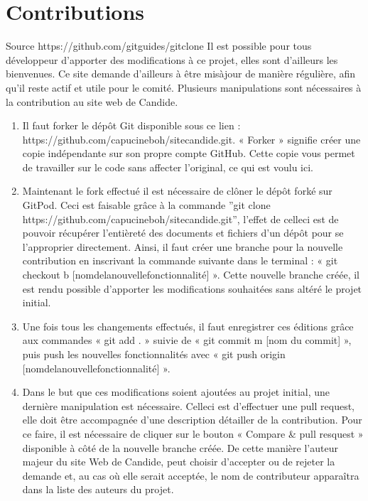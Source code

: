 \documentclass[a4,10pt,french]{sphinxmanual}
\begin{document}
\section{Contributions}
\label{\detokenize{chapitre-02:contributions}}
\sphinxAtStartPar
Source https://github.com/git\sphinxhyphen{}guides/git\sphinxhyphen{}clone
Il est possible pour tous développeur d’apporter des modifications à ce projet, elles sont d’ailleurs les bienvenues. Ce site demande d’ailleurs à être mis\sphinxhyphen{}à\sphinxhyphen{}jour de manière régulière, afin qu’il reste actif et utile pour le comité. Plusieurs manipulations sont nécessaires à la contribution au site web de Candide.
\begin{enumerate}
%
\item {} 
\sphinxAtStartPar
Il faut forker le dépôt Git disponible sous ce lien : https://github.com/capucineboh/site\sphinxhyphen{}candide.git. « Forker » signifie créer une copie indépendante sur son propre compte GitHub. Cette copie vous permet de travailler sur le code sans affecter l’original, ce qui est voulu ici.

\item {} 
\sphinxAtStartPar
Maintenant le fork effectué il est nécessaire de clôner le dépôt forké sur GitPod. Ceci est faisable grâce à la commande ”git clone https://github.com/capucineboh/site\sphinxhyphen{}candide.git”, l’effet de celle\sphinxhyphen{}ci est de pouvoir récupérer l’entièreté des documents et fichiers d’un dépôt pour se l’approprier directement. Ainsi, il faut créer une branche pour la nouvelle contribution en inscrivant la commande suivante dans le terminal : « git checkout \sphinxhyphen{}b {[}nom\sphinxhyphen{}de\sphinxhyphen{}la\sphinxhyphen{}nouvelle\sphinxhyphen{}fonctionnalité{]} ». Cette nouvelle branche créée, il est rendu possible d’apporter les modifications souhaitées sans altéré le projet initial.

\item {} 
\sphinxAtStartPar
Une fois tous les changements effectués, il faut enregistrer ces éditions grâce aux commandes « git add . » suivie de « git commit \sphinxhyphen{}m {[}nom du commit{]} », puis push les nouvelles fonctionnalités avec « git push origin {[}nom\sphinxhyphen{}de\sphinxhyphen{}la\sphinxhyphen{}nouvelle\sphinxhyphen{}fonctionnalité{]} ».

\item {} 
\sphinxAtStartPar
Dans le but que ces modifications soient ajoutées au projet initial, une dernière manipulation est nécessaire. Celle\sphinxhyphen{}ci est d’effectuer une pull request, elle doit être accompagnée d’une description détailler de la contribution. Pour ce faire, il est nécessaire de cliquer sur le bouton « Compare \& pull resquest » disponible à côté de la nouvelle branche créée. De cette manière l’auteur majeur du site Web de Candide, peut choisir d’accepter ou de rejeter la demande et, au cas où elle serait acceptée, le nom de contributeur apparaîtra dans la liste des auteurs du projet.

\end{enumerate}
\end{document}
